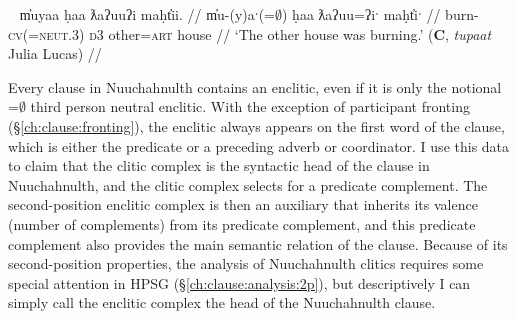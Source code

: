 \ex~ \label{ex:2padjpart}
\begingl
\glpreamble m̓uyaa ḥaa ƛaʔuuʔi maḥt̓ii. //
\gla m̓u-(y)aˑ(=$\emptyset$) ḥaa ƛaʔuu=ʔiˑ maḥt̓iˑ  //
\glb burn-\textsc{cv}(=\textsc{neut.3}) \textsc{d3} other=\textsc{art} house //
\glft `The other house was burning.' (\textbf{C}, \textit{tupaat} Julia Lucas) //
\endgl
\xe


Every clause in Nuuchahnulth contains an enclitic, even if it is only the notional =$\emptyset$ third person neutral enclitic. With the exception of participant fronting (\S\ref{ch:clause:fronting}), the enclitic always appears on the first word of the clause, which is either the predicate or a preceding adverb or coordinator. I use this data to claim that the clitic complex is the syntactic head of the clause in Nuuchahnulth, and the clitic complex selects for a predicate complement. The second-position enclitic complex is then an auxiliary that inherits its valence (number of complements) from its predicate complement, and this predicate complement also provides the main semantic relation of the clause. Because of its second-position properties, the analysis of Nuuchahnulth clitics requires some special attention in HPSG (\S\ref{ch:clause:analysis:2p}), but descriptively I can simply call the enclitic complex the head of the Nuuchahnulth clause.

